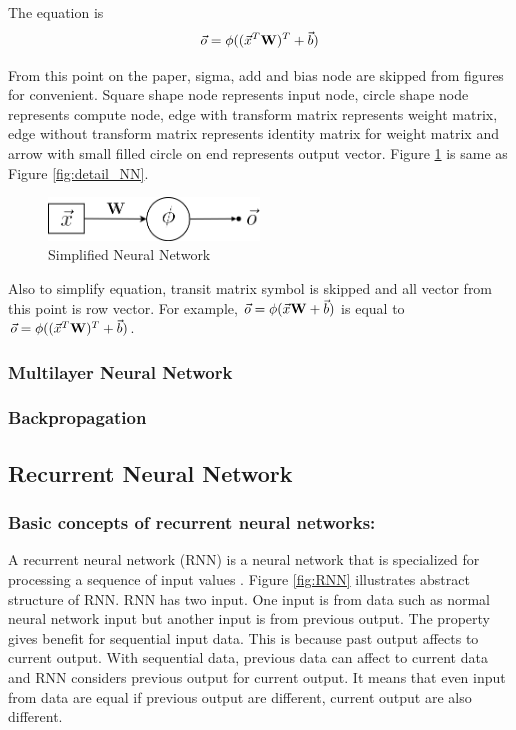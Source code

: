 \documentclass[draft,dvipsnames]{drexel-thesis}
\begin{document}
\begin{thesis}
The equation is
$$\vec{o} = \bold{\phi}((\vec{x}^T\bold{W})^T+\vec{b})$$

From this point on the paper, sigma, add and bias node are skipped from figures for convenient. Square shape node represents input node, circle shape node represents compute node, edge with transform matrix represents weight matrix, edge without transform matrix represents identity matrix for weight matrix and arrow with small filled circle on end represents output vector. Figure \ref{fig:NN} is same as Figure \ref{fig:detail_NN}.

\begin{figure}[t!]
    \centering
    \includegraphics[width=0.5\textwidth]{pictures/figures/NN.png}
    \caption{Simplified Neural Network}
    \label{fig:NN}
\end{figure}

Also to simplify equation, transit matrix symbol is skipped and all vector from this point is row vector. For example, $\vec{o} = \bold{\phi}(\vec{x}\bold{W}+\vec{b})$ is equal to $\vec{o} = \bold{\phi}((\vec{x}^T\bold{W})^T+\vec{b})$.


\subsubsection{Multilayer Neural Network}\label{subsubsec:MNN}
\subsubsection{Backpropagation}\label{subsubsec:BP}


\subsection{Recurrent Neural Network}\label{subsec:RNN}

\subsubsection{Basic concepts of recurrent neural networks:}\label{basicRNN}
	A recurrent neural network (RNN) is a neural network that is specialized for processing a sequence of input values \cite{Goodfellow-et-al-2016}. Figure \ref{fig:RNN} illustrates abstract structure of RNN. RNN has two input. One input is from data such as normal neural network input but another input is from previous output. The property gives benefit for sequential input data. This is because past output affects to current output. With sequential data, previous data can affect to current data and RNN considers previous output for current output. It means that even input from data are equal if previous output are different, current output are also different.


\end{thesis}
\end{document}

